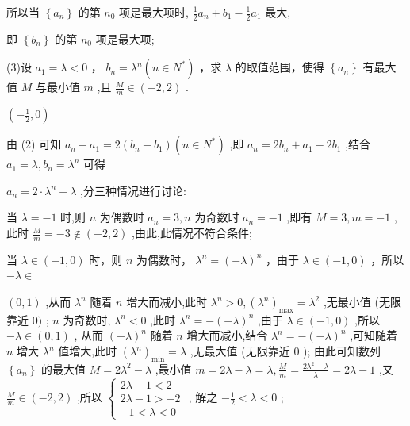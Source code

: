 \documentclass[10pt]{article}
\newcommand*\circled[1]{\tikz[baseline=(char.base)]{\node[shape=circle,draw,inner sep=1.5pt] (char) {\small #1};}}
\begin{document}
所以当 \(\left\{  {a}_{n}\right\}\) 的第 \({n}_{0}\) 项是最大项时, \(\frac{1}{2}{a}_{n} + {b}_{1} - \frac{1}{2}{a}_{1}\) 最大,

即 \(\left\{  {b}_{n}\right\}\) 的第 \({n}_{0}\) 项是最大项;

(3)设 \({a}_{1} = \lambda  < 0\) ， \({b}_{n} = {\lambda }^{n}\left( {n \in  {N}^{ * }}\right)\) ，求 \(\lambda\) 的取值范围，使得 \(\left\{  {a}_{n}\right\}\) 有最大值 \(M\) 与最小值 \(m\) ,且 \(\frac{M}{m} \in  \left( {-2,2}\right)\) .

\(\left( {-\frac{1}{2},0}\right)\)

由 (2) 可知 \({a}_{n} - {a}_{1} = 2\left( {{b}_{n} - {b}_{1}}\right) \left( {n \in  {N}^{ * }}\right)\) ,即 \({a}_{n} = 2{b}_{n} + {a}_{1} - 2{b}_{1}\) ,结合 \({a}_{1} = \lambda ,{b}_{n} = {\lambda }^{n}\) 可得

\({a}_{n} = 2 \cdot  {\lambda }^{n} - \lambda\) ,分三种情况进行讨论:

 \circled{1}  当 \(\lambda  =  - 1\) 时,则 \(n\) 为偶数时 \({a}_{n} = 3,n\) 为奇数时 \({a}_{n} =  - 1\) ,即有 \(M = 3,m =  - 1\) , 此时 \(\frac{M}{m} =  - 3 \notin  \left( {-2,2}\right)\) ,由此,此情况不符合条件;

 \circled{2} 当 \(\lambda  \in  \left( {-1,0}\right)\) 时，则 \(n\) 为偶数时， \({\lambda }^{n} = {\left( -\lambda \right) }^{n}\) ，由于 \(\lambda  \in  \left( {-1,0}\right)\) ，所以 \(- \lambda  \in\)

\(\left( {0,1}\right)\) ,从而 \({\lambda }^{n}\) 随着 \(n\) 增大而减小,此时 \({\lambda }^{n} > 0,{\left( {\lambda }^{n}\right) }_{\max } = {\lambda }^{2}\) ,无最小值 (无限靠近 \(0)\) ; \(n\) 为奇数时, \({\lambda }^{n} < 0\) ,此时 \({\lambda }^{n} =  - {\left( -\lambda \right) }^{n}\) ,由于 \(\lambda  \in  \left( {-1,0}\right)\) ,所以 \(- \lambda  \in  \left( {0,1}\right)\) , 从而 \({\left( -\lambda \right) }^{n}\) 随着 \(n\) 增大而减小,结合 \({\lambda }^{n} =  - {\left( -\lambda \right) }^{n}\) ,可知随着 \(n\) 增大 \({\lambda }^{n}\) 值增大,此时 \({\left( {\lambda }^{n}\right) }_{\min } = \lambda\) ,无最大值 (无限靠近 0 ); 由此可知数列 \(\left\{  {a}_{n}\right\}\) 的最大值 \(M = 2{\lambda }^{2} - \lambda\) ,最小值 \(m = {2\lambda } - \lambda  = \lambda ,\frac{M}{m} = \frac{2{\lambda }^{2} - \lambda }{\lambda } = {2\lambda } - 1\) ,又 \(\frac{M}{m} \in  \left( {-2,2}\right)\) ,所以 \(\left\{  \begin{array}{l} {2\lambda } - 1 < 2 \\  {2\lambda } - 1 >  - 2 \\   - 1 < \lambda  < 0 \end{array}\right.\) , 解之 \(- \frac{1}{2} < \lambda  < 0\) ;
\end{document}
